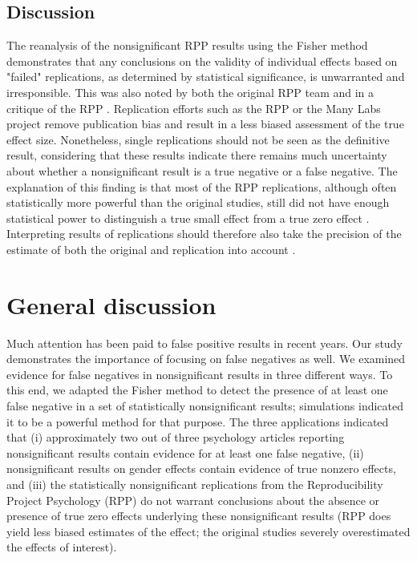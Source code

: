\documentclass{article}
\begin{document}
\subsection*{Discussion}

The reanalysis of the nonsignificant RPP results using the Fisher method demonstrates that any conclusions on the validity of individual effects based on "failed" replications, as determined by statistical significance, is unwarranted and irresponsible. This was also noted by both the original RPP team \cite{Open_Science_Collaboration2015-zs,Anderson2016-bv} and in a critique of the RPP \cite{Gilbert2016-mi}. Replication efforts such as the RPP or the Many Labs project remove publication bias and result in a less biased assessment of the true effect size. Nonetheless, single replications should not be seen as the definitive result, considering that these results indicate there remains much uncertainty about whether a nonsignificant result is a true negative or a false negative. The explanation of this finding is that most of the RPP replications, although often statistically more powerful than the original studies, still did not have enough statistical power to distinguish a true small effect from a true zero effect \cite{Maxwell2015-yb}. Interpreting results of replications should therefore also take the precision of the estimate of both the original and replication into account \cite{Cumming2014-fi}.

\section*{General discussion}

Much attention has been paid to false positive results in recent years. Our study demonstrates the importance of focusing on false negatives as well. We examined evidence for false negatives in nonsignificant results in three different ways. To this end, we adapted the Fisher method to detect the presence of at least one false negative in a set of statistically nonsignificant results; simulations indicated it to be a powerful method for that purpose. The three applications indicated that (i) approximately two out of three psychology articles reporting nonsignificant results contain evidence for at least one false negative, (ii) nonsignificant results on gender effects contain evidence of true nonzero effects, and (iii) the statistically nonsignificant replications from the Reproducibility Project Psychology (RPP) do not warrant conclusions about the absence or presence of true zero effects underlying these nonsignificant results (RPP does yield less biased estimates of the effect; the original studies severely overestimated the effects of interest).
\end{document}
